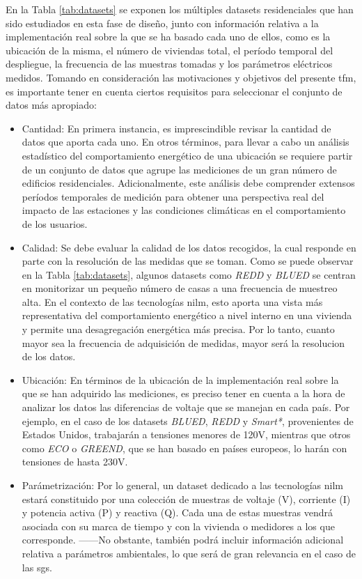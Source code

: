 \vspace{3mm}

En la Tabla \ref{tab:datasets} se exponen los múltiples datasets residenciales que han sido estudiados en esta fase de diseño, junto con información relativa a la implementación real sobre la que se ha basado cada uno de ellos, como es la ubicación de la misma, el número de viviendas total, el período temporal del despliegue, la frecuencia de las muestras tomadas y los parámetros eléctricos medidos. Tomando en consideración las motivaciones y objetivos del presente \gls{tfm}, es importante tener en cuenta ciertos requisitos para seleccionar el conjunto de datos más apropiado:

\vspace{1mm}

\begin{itemize}
    \item Cantidad: En primera instancia, es imprescindible revisar la cantidad de datos que aporta cada uno. En otros términos, para llevar a cabo un análisis estadístico del comportamiento energético de una ubicación se requiere partir de un conjunto de datos que agrupe las mediciones de un gran número de edificios residenciales. Adicionalmente, este análisis debe comprender extensos períodos temporales de medición para obtener una perspectiva real del impacto de las estaciones y las condiciones climáticas en el comportamiento de los usuarios.
    \item Calidad: Se debe evaluar la calidad de los datos recogidos, la cual responde en parte con la resolución de las medidas que se toman. Como se puede observar en la Tabla \ref{tab:datasets}, algunos datasets como \textit{REDD} y \textit{BLUED} se centran en monitorizar un pequeño número de casas a una frecuencia de muestreo alta. En el contexto de las tecnologías \gls{nilm}, esto aporta una vista más representativa del comportamiento energético a nivel interno en una vivienda y permite una desagregación energética más precisa. Por lo tanto, cuanto mayor sea la frecuencia de adquisición de medidas, mayor será la resolucion de los datos.
    \item Ubicación: En términos de la ubicación de la implementación real sobre la que se han adquirido las mediciones, es preciso tener en cuenta a la hora de analizar los datos las diferencias de voltaje que se manejan en cada país. Por ejemplo, en el caso de los datasets \textit{BLUED}, \textit{REDD} y \textit{Smart*}, provenientes de Estados Unidos, trabajarán a tensiones menores de 120V, mientras que otros como \textit{ECO} o \textit{GREEND}, que se han basado en países europeos, lo harán con tensiones de hasta 230V. \cite{greend}
    \item Parámetrización: Por lo general, un dataset dedicado a las tecnologías \gls{nilm} estará constituido por una colección de muestras de voltaje (V), corriente (I) y potencia activa (P) y reactiva (Q). Cada una de estas muestras vendrá asociada con su marca de tiempo y con la vivienda o medidores a los que corresponde. ------No obstante, también podrá incluir información adicional relativa a parámetros ambientales, lo que será de gran relevancia en el caso de las \gls{sg}s.
\end{itemize}



